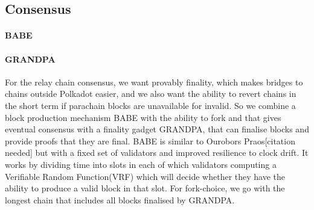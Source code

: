 \subsection{Consensus}
\paragraph{BABE}

\paragraph{GRANDPA} \label{sec:grandpa}
For the relay chain consensus, we want provably finality, which makes bridges to chains outside Polkadot easier, and we also want the ability to revert chains in the short term if parachain blocks are unavailable for invalid.
So we combine a block production mechanism BABE with the ability to fork and that gives eventual consensus with a finality gadget GRANDPA, that can finalise blocks and provide proofs that they are final.
BABE is similar to Ourobors Praos[citation needed] but with a fixed set of validators and improved resilience to clock drift.
It works by dividing time into slots in each of which validators computing a Verifiable Random Function(VRF) which will decide whether they have the ability to produce a valid block in that slot.
For fork-choice, we go with the longest chain that includes all blocks finalised by GRANDPA.
